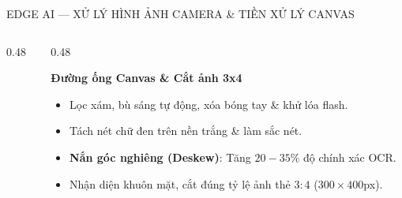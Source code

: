 \documentclass[aspectratio=169, 10pt]{beamer}
\begin{document}
\begin{frame}{EDGE AI — XỬ LÝ HÌNH ẢNH CAMERA \& TIỀN XỬ LÝ CANVAS}
\begin{columns}[T]
\begin{column}{0.48\textwidth}
    \end{column}
    \begin{column}{0.48\textwidth}
      \begin{infoCard}
        \textbf{\color{DarkRed}Đường ống Canvas \& Cắt ảnh 3x4}
        \fontsize{6.8pt}{8.5pt}\selectfont
        \begin{itemize}
          \setlength{\itemsep}{1.2pt}
          \item Lọc xám, bù sáng tự động, xóa bóng tay \& khử lóa flash.
          \item Tách nét chữ đen trên nền trắng \& làm sắc nét.
          \item \textbf{Nắn góc nghiêng (Deskew)}: Tăng $20-35\%$ độ chính xác OCR.
          \item Nhận diện khuôn mặt, cắt đúng tỷ lệ ảnh thẻ $3:4$ ($300 \times 400$px).
        \end{itemize}
      \end{infoCard}
    \end{column}
  \end{columns}
\end{frame}
\end{document}
